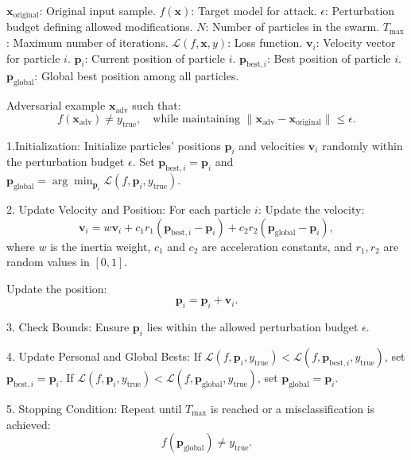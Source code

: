 
$\mathbf{x}_{\text{original}}$: Original input sample.  
$f(\mathbf{x})$: Target model for attack.  
$\epsilon$: Perturbation budget defining allowed modifications.  
$N$: Number of particles in the swarm.  
$T_{\text{max}}$: Maximum number of iterations.  
$\mathcal{L}(f, \mathbf{x}, y)$: Loss function.  
$\mathbf{v}_i$: Velocity vector for particle $i$.  
$\mathbf{p}_i$: Current position of particle $i$.  
$\mathbf{p}_{\text{best}, i}$: Best position of particle $i$.  
$\mathbf{p}_{\text{global}}$: Global best position among all particles.

Adversarial example $\mathbf{x}_{\text{adv}}$ such that:  
\[
f(\mathbf{x}_{\text{adv}}) \neq y_{\text{true}}, \quad \text{while maintaining $\|\mathbf{x}_{\text{adv}} - \mathbf{x}_{\text{original}}\| \leq \epsilon$}.
\]

1.Initialization:  
   Initialize particles' positions $\mathbf{p}_i$ and velocities $\mathbf{v}_i$ randomly within the perturbation budget $\epsilon$.  
   Set $\mathbf{p}_{\text{best}, i} = \mathbf{p}_i$ and $\mathbf{p}_{\text{global}} = \arg\min_{\mathbf{p}_i} \mathcal{L}(f, \mathbf{p}_i, y_{\text{true}})$.  

2. Update Velocity and Position: For each particle $i$:  
   Update the velocity:  
   \[
   \mathbf{v}_i = w \mathbf{v}_i + c_1 r_1 (\mathbf{p}_{\text{best}, i} - \mathbf{p}_i) + c_2 r_2 (\mathbf{p}_{\text{global}} - \mathbf{p}_i),
   \]  
   where $w$ is the inertia weight, $c_1$ and $c_2$ are acceleration constants, and $r_1, r_2$ are random values in $[0, 1]$.  

   Update the position:  
   \[
   \mathbf{p}_i = \mathbf{p}_i + \mathbf{v}_i.  
   \]

3. Check Bounds:  
   Ensure $\mathbf{p}_i$ lies within the allowed perturbation budget $\epsilon$.  

4. Update Personal and Global Bests:  
   If $\mathcal{L}(f, \mathbf{p}_i, y_{\text{true}}) < \mathcal{L}(f, \mathbf{p}_{\text{best}, i}, y_{\text{true}})$, set $\mathbf{p}_{\text{best}, i} = \mathbf{p}_i$.  
   If $\mathcal{L}(f, \mathbf{p}_i, y_{\text{true}}) < \mathcal{L}(f, \mathbf{p}_{\text{global}}, y_{\text{true}})$, set $\mathbf{p}_{\text{global}} = \mathbf{p}_i$.  

5. Stopping Condition:  
   Repeat until $T_{\text{max}}$ is reached or a misclassification is achieved:  
   \[
   f(\mathbf{p}_{\text{global}}) \neq y_{\text{true}}.  
   \]

